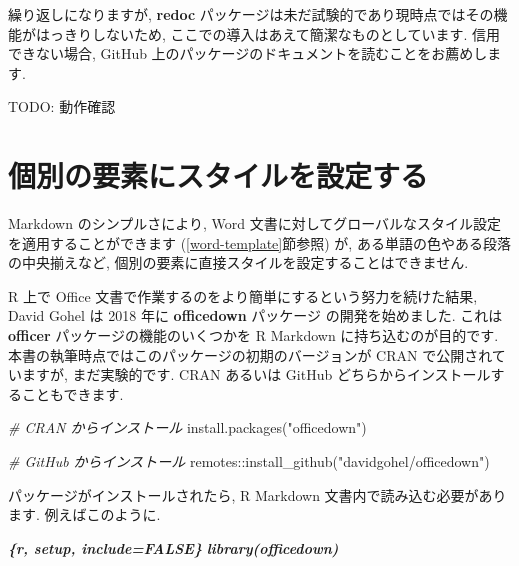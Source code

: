 \documentclass[
  11pt,
]{bxjsreport}
\newenvironment{Shaded}{\begin{snugshade}}{\end{snugshade}}
\newcommand{\CommentTok}[1]{\textcolor[rgb]{0.56,0.35,0.01}{\textit{#1}}}
\newcommand{\FunctionTok}[1]{\textcolor[rgb]{0.00,0.00,0.00}{#1}}
\newcommand{\InformationTok}[1]{\textcolor[rgb]{0.56,0.35,0.01}{\textbf{\textit{#1}}}}
\newcommand{\NormalTok}[1]{#1}
\newcommand{\SpecialCharTok}[1]{\textcolor[rgb]{0.00,0.00,0.00}{#1}}
\newcommand{\StringTok}[1]{\textcolor[rgb]{0.31,0.60,0.02}{#1}}
\begin{document}
繰り返しになりますが, \textbf{redoc} パッケージは未だ試験的であり現時点ではその機能がはっきりしないため, ここでの導入はあえて簡潔なものとしています. 信用できない場合, GitHub 上のパッケージのドキュメントを読むことをお薦めします.

TODO: 動作確認

\hypertarget{word-officedown}{%
\section{個別の要素にスタイルを設定する}\label{word-officedown}}

Markdown のシンプルさにより, Word 文書に対してグローバルなスタイル設定を適用することができます (\ref{word-template}節参照) が, ある単語の色やある段落の中央揃えなど, 個別の要素に直接スタイルを設定することはできません.

R 上で Office 文書で作業するのをより簡単にするという努力を続けた結果, David Gohel は 2018 年に \textbf{officedown} パッケージ \autocite{R-officedown}の開発を始めました. これは \textbf{officer} \autocite{R-officer} パッケージの機能のいくつかを R Markdown に持ち込むのが目的です. 本書の執筆時点ではこのパッケージの初期のバージョンが CRAN で公開されていますが, まだ実験的です. CRAN あるいは GitHub どちらからインストールすることもできます.

\begin{Shaded}
\begin{Highlighting}[]
\CommentTok{\# CRAN からインストール}
\FunctionTok{install.packages}\NormalTok{(}\StringTok{"officedown"}\NormalTok{)}

\CommentTok{\# GitHub からインストール}
\NormalTok{remotes}\SpecialCharTok{::}\FunctionTok{install\_github}\NormalTok{(}\StringTok{"davidgohel/officedown"}\NormalTok{)}
\end{Highlighting}
\end{Shaded}

パッケージがインストールされたら, R Markdown 文書内で読み込む必要があります. 例えばこのように.

\begin{Shaded}
\begin{Highlighting}[]
\InformationTok{\textasciigrave{}\textasciigrave{}\textasciigrave{}\{r, setup, include=FALSE\}}
\InformationTok{library(officedown)}
\InformationTok{\textasciigrave{}\textasciigrave{}\textasciigrave{}}
\end{Highlighting}
\end{Shaded}
\end{document}
